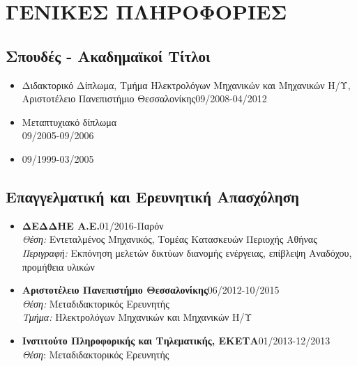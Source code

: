 \documentclass[11pt]{article}
\begin{document}
\pagestyle{fancy}
\justify
\section{ΓΕΝΙΚΕΣ ΠΛΗΡΟΦΟΡΙΕΣ}

\subsection{Σπουδές - Ακαδημαϊκοί Τίτλοι}
\begin{itemize}
\item Διδακτορικό Δίπλωμα, Τμήμα Ηλεκτρολόγων Μηχανικών και Μηχανικών Η/Υ, \\Αριστοτέλειο Πανεπιστήμιο Θεσσαλονίκης\hfill{}09/2008-04/2012
\item Μεταπτυχιακό δίπλωμα   \\  \hfill{}09/2005-09/2006
\item  {}
\hfill{}09/1999-03/2005
\end{itemize}

\subsection{Επαγγελματική και Ερευνητική Απασχόληση}
\begin{itemize}

\item \textbf{ΔΕΔΔΗΕ Α.Ε.}\hfill{}01/2016-Παρόν\\
\emph{Θέση:} Εντεταλμένος Μηχανικός, Τομέας Κατασκευών Περιοχής Αθήνας\\
\emph{Περιγραφή:} Εκπόνηση μελετών δικτύων διανομής ενέργειας, επίβλεψη Αναδόχου, προμήθεια υλικών

\item \textbf{Αριστοτέλειο Πανεπιστήμιο Θεσσαλονίκης}\hfill{}06/2012-10/2015\\
\emph{Θέση:} Μεταδιδακτορικός Ερευνητής\\
\emph{Τμήμα:} Ηλεκτρολόγων Μηχανικών και Μηχανικών Η/Υ

\item \textbf{Ινστιτούτο Πληροφορικής και Τηλεματικής, ΕΚΕΤΑ}\hfill{}01/2013-12/2013\\
\emph{Θέση}: Μεταδιδακτορικός Ερευνητής
\end{itemize}
\end{document}
